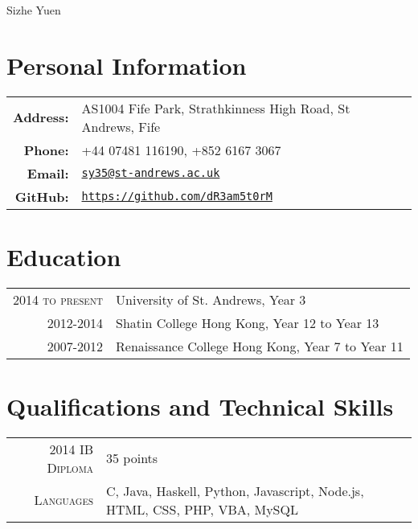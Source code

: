 \documentclass{article}
\begin{document}
\pagestyle{empty} %


\par{\centering
		{\Huge Sizhe Yuen
	}\bigskip\par}

\section*{Personal Information}

\begin{tabular}{rl}
    \textbf{Address:}   & AS1004 Fife Park, Strathkinness High Road, St Andrews, Fife \\
    \textbf{Phone:}     & +44 07481 116190, +852 6167 3067 \\
    \textbf{Email:}     & \texttt{\href{mailto:sy35@st-andrews.ac.uk}{sy35@st-andrews.ac.uk}} \\
    \textbf{GitHub:}    & \texttt{\href{https://github.com/dR3am5t0rM}{https://github.com/dR3am5t0rM}}
\end{tabular}

\section*{Education}
\begin{tabular}{r|p{15cm}}
\textsc{2014 to present} & University of St. Andrews, Year 3\\

\textsc{2012-2014} & Shatin College Hong Kong, Year 12 to Year 13\\

\textsc{2007-2012} & Renaissance College Hong Kong, Year 7 to Year 11\\

\end{tabular}
\section*{Qualifications and Technical Skills}
\begin{tabular}{r|p{15cm}}
\textsc{2014 IB Diploma} &  35 points\\
\textsc{Languages} & C, Java, Haskell, Python, Javascript, Node.js, HTML, CSS, PHP, VBA, MySQL\\
\end{tabular}
\end{document}
